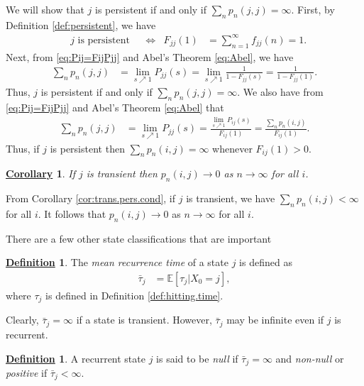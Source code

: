 \documentclass[12pt]{book}
\numberwithin{equation}{chapter}
\theoremstyle{plain}
\numberwithin{theorem}{section}
\newtheorem{corollary}[theorem]{\underline{Corollary}}
\theoremstyle{definition}
\newtheorem{definition}[theorem]{\underline{Definition}}
\numberwithin{exercise}{chapter}
\let\oldendproof\endproof
\renewenvironment{proof}[1][\proofname]{%
  \oldproof[\scshape\underline{#1}]%
}{\oldendproof}
\newcommand{\<}{\langle}
\renewcommand{\>}{\rangle}
\renewcommand{\(}{\left(}
\renewcommand{\)}{\right)}
\renewcommand{\[}{\left[}
\renewcommand{\]}{\right]}
\newcommand\Eb{\mathds{E}}
\newcommand\taub{\bar{\tau}}
\begin{document}
\begin{proof}
We will show that $j$ is persistent if and only if $\sum_n p_n(j,j) = \infty$.
First, by Definition \ref{def:persistent}, we have
\begin{align}
	&\text{$j$ is persistent}&
	&\Leftrightarrow&
F_{jj}(1)
	&=	\sum_{n=1}^\infty f_{jj}(n) = 1.
\end{align}
Next, from \eqref{eq:Pij=FijPjj} and Abel's Theorem \eqref{eq:Abel}, we have
\begin{align}
\sum_n p_n(j,j)
	&=	\lim_{s \nearrow 1} P_{jj}(s)
	=		\lim_{s \nearrow 1}\frac{1}{1-F_{jj}(s)} 
	=		\frac{1}{1-F_{jj}(1)} .
\end{align}
Thus, $j$ is persistent if and only if $\sum_n p_n(j,j)=\infty$.
We also have from \eqref{eq:Pij=FijPjj} and Abel's Theorem \eqref{eq:Abel} that
\begin{align}
\sum_n p_n(j,j)
	&=	\lim_{s \nearrow 1} P_{jj}(s)
	=		\frac{ \lim_{s \nearrow 1}  P_{ij}(s)}{F_{ij}(1)} 
	=		\frac{ \sum_n p_n(i,j)}{F_{ij}(1)} .
\end{align} 
Thus, if $j$ is persistent then $\sum_n p_n(i,j) = \infty$ whenever $F_{ij}(1) > 0$.
\end{proof}

\begin{corollary}
\label{cor:pnij.to.0}
If $j$ is transient then $p_n(i,j) \to 0$ as $n \to \infty$ for all $i$.
\end{corollary}

\begin{proof}
From Corollary \ref{cor:trans.pers.cond}, if $j$ is transient, we have $\sum_n p_n(i,j) < \infty$ for all $i$.  It follows that $p_n(i,j) \to 0$ as $n \to \infty$ for all $i$.
\end{proof}

\noindent
There are a few other state classifications that are important

\begin{definition}
\label{def:tau.bar}
The \emph{mean recurrence time} of a state $j$ is defined as
\begin{align}
\taub_j
	&=	\Eb[ \tau_j | X_0 = j ] ,
\end{align}
where $\tau_j$ is defined in Definition \ref{def:hitting.time}.
\end{definition}

\noindent
Clearly, $\taub_j = \infty$ if a state is transient.  However, $\taub_j$ may be infinite even if $j$ is recurrent.

\begin{definition}
\label{def:null}
A recurrent state $j$ is said to be \emph{null} if $\taub_j = \infty$ and \emph{non-null} or \emph{positive} if $\taub_j < \infty$.
\end{definition}
\end{document}
